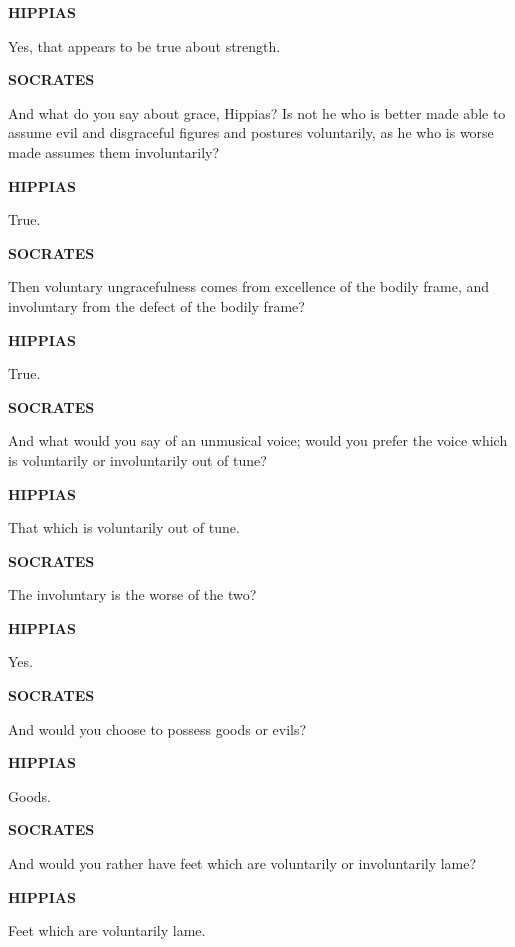 \documentclass[11pt,letter]{article}
\begin{document}
\par \textbf{HIPPIAS}
\par   Yes, that appears to be true about strength.

\par \textbf{SOCRATES}
\par   And what do you say about grace, Hippias? Is not he who is better made able to assume evil and disgraceful figures and postures voluntarily, as he who is worse made assumes them involuntarily?

\par \textbf{HIPPIAS}
\par   True.

\par \textbf{SOCRATES}
\par   Then voluntary ungracefulness comes from excellence of the bodily frame, and involuntary from the defect of the bodily frame?

\par \textbf{HIPPIAS}
\par   True.

\par \textbf{SOCRATES}
\par   And what would you say of an unmusical voice; would you prefer the voice which is voluntarily or involuntarily out of tune?

\par \textbf{HIPPIAS}
\par   That which is voluntarily out of tune.

\par \textbf{SOCRATES}
\par   The involuntary is the worse of the two?

\par \textbf{HIPPIAS}
\par   Yes.

\par \textbf{SOCRATES}
\par   And would you choose to possess goods or evils?

\par \textbf{HIPPIAS}
\par   Goods.

\par \textbf{SOCRATES}
\par   And would you rather have feet which are voluntarily or involuntarily lame?

\par \textbf{HIPPIAS}
\par   Feet which are voluntarily lame.
\end{document}
